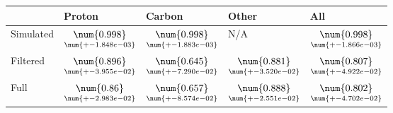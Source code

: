 \begin{tabular}{lllll}
\toprule
{} &                                              Proton &                                              Carbon &                                               Other &                                                 All \\
\midrule
Simulated &  $\underset{\num{+- 1.848e-03 }  }{\num{ 0.998 } }$ &  $\underset{\num{+- 1.883e-03 }  }{\num{ 0.998 } }$ &  N/A &  $\underset{\num{+- 1.866e-03 }  }{\num{ 0.998 } }$ \\
Filtered  &  $\underset{\num{+- 3.955e-02 }  }{\num{ 0.896 } }$ &  $\underset{\num{+- 7.290e-02 }  }{\num{ 0.645 } }$ &  $\underset{\num{+- 3.520e-02 }  }{\num{ 0.881 } }$ &  $\underset{\num{+- 4.922e-02 }  }{\num{ 0.807 } }$ \\
Full      &  $\underset{\num{+- 2.983e-02 }  }{\num{ 0.86 } }$ &  $\underset{\num{+- 8.574e-02 }  }{\num{ 0.657 } }$ &  $\underset{\num{+- 2.551e-02 }  }{\num{ 0.888 } }$ &  $\underset{\num{+- 4.702e-02 }  }{\num{ 0.802 } }$ \\
\bottomrule
\end{tabular}
